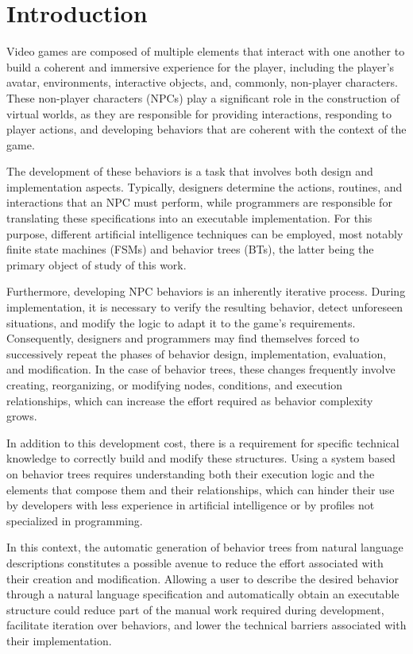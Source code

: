 \chapter*{Introduction}
\label{cap:introduction}

Video games are composed of multiple elements that interact with one another to build a coherent and immersive experience for the player, including the player's avatar, environments, interactive objects, and, commonly, non-player characters.
These non-player characters (NPCs) play a significant role in the construction of virtual worlds, as they are responsible for providing interactions, responding to player actions, and developing behaviors that are coherent with the context of the game.

The development of these behaviors is a task that involves both design and implementation aspects.
Typically, designers determine the actions, routines, and interactions that an NPC must perform, while programmers are responsible for translating these specifications into an executable implementation.
For this purpose, different artificial intelligence techniques can be employed, most notably finite state machines (FSMs) and behavior trees (BTs), the latter being the primary object of study of this work.

Furthermore, developing NPC behaviors is an inherently iterative process.
During implementation, it is necessary to verify the resulting behavior, detect unforeseen situations, and modify the logic to adapt it to the game's requirements.
Consequently, designers and programmers may find themselves forced to successively repeat the phases of behavior design, implementation, evaluation, and modification.
In the case of behavior trees, these changes frequently involve creating, reorganizing, or modifying nodes, conditions, and execution relationships, which can increase the effort required as behavior complexity grows.

In addition to this development cost, there is a requirement for specific technical knowledge to correctly build and modify these structures.
Using a system based on behavior trees requires understanding both their execution logic and the elements that compose them and their relationships, which can hinder their use by developers with less experience in artificial intelligence or by profiles not specialized in programming.

In this context, the automatic generation of behavior trees from natural language descriptions constitutes a possible avenue to reduce the effort associated with their creation and modification.
Allowing a user to describe the desired behavior through a natural language specification and automatically obtain an executable structure could reduce part of the manual work required during development, facilitate iteration over behaviors, and lower the technical barriers associated with their implementation.

